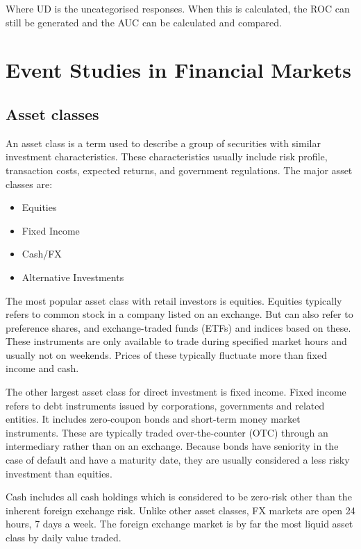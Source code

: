 Where UD is the uncategorised responses. When this is calculated, the ROC can still be generated and the AUC can be calculated and compared.

\pagebreak
\section{Event Studies in Financial Markets}

\subsection{Asset classes}

An asset class is a term used to describe a group of securities with similar investment characteristics. These characteristics usually include risk profile, transaction costs, expected returns, and government regulations\cite{ross_corp}. The major asset classes are:

\begin{itemize}
    \item Equities
    \item Fixed Income
    \item Cash/FX
    \item Alternative Investments
\end{itemize}

The most popular asset class with retail investors is equities. Equities typically refers to common stock in a company listed on an exchange. But can also refer to preference shares, and exchange-traded funds (ETFs) and indices based on these. These instruments are only available to trade during specified market hours and usually not on weekends. Prices of these typically fluctuate more than fixed income and cash.

The other largest asset class for direct investment is fixed income. Fixed income refers to debt instruments issued by corporations, governments and related entities. It includes zero-coupon bonds and short-term money market instruments. These are typically traded over-the-counter (OTC) through an intermediary rather than on an exchange. Because bonds have seniority in the case of default and have a maturity date, they are usually considered a less risky investment than equities\cite{ross_corp}.

Cash includes all cash holdings which is considered to be zero-risk other than the inherent foreign exchange risk. Unlike other asset classes, FX markets are open 24 hours, 7 days a week. The foreign exchange market is by far the most liquid asset class by daily value traded\cite{ross_corp}.


